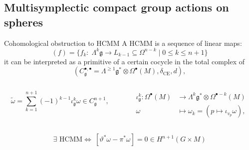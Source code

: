 \documentclass[handout,10pt]{beamer}
\begin{document}
\subsection{Multisymplectic compact group actions on spheres}

\begin{frame}[fragile]{Cohomological obstruction to HCMM}
A HCMM is a sequence of linear maps:
			\begin{displaymath}
				(f)  = \big\lbrace f_k: \; \Lambda^k{\mathfrak g} \to L_{k-1} \subseteq \Omega^{n-k} 
				\;\big\vert\; 0\leq k \leq n+1  \big\rbrace
			\end{displaymath}
it can be interpreted as a primitive of a certain cocycle in the total complex of 
	\begin{displaymath}
		(C_\mathfrak{g}^{\bullet,\bullet} = \Lambda^{\geq 1} 
		\mathfrak{g}^*\otimes \Omega^\bullet(M), \delta_\text{CE},d),	
	\end{displaymath}
	\pause
	\begin{propblock}[$\exists$ HCMM 
		$\Leftrightarrow ~ \lbrack\tilde{\omega}\rbrack=0\in H^{n+1}(C_\mathfrak g^\bullet,d_ {tot})$	
	]
		\begin{columns}
		\begin{column}{.5\textwidth}
			\begin{displaymath}
				\tilde{\omega} = \sum_{k=1}^{n+1} (-1)^{k-1} \iota^k_\mathfrak{g} \omega \in C_\mathfrak{g}^{n+1},
			\end{displaymath}		
		\end{column}
		\begin{column}{.5\textwidth}
			\begin{align*}
				\iota^k_\mathfrak{g} \colon \Omega^\bullet(M)
				&\to \Lambda^k \mathfrak{g}^\ast \otimes \Omega^{\bullet-k}(M)
				\\ \omega&\mapsto \omega_k = 
				\left(p \mapsto \iota_{v_p} \omega  \right) ,
			\end{align*}
		\end{column}		
		\end{columns} 
	\end{propblock}
	\pause
	\begin{corblock}
	$$\exists \text{ HCMM} 
		\Leftrightarrow ~[\vartheta^*\omega-\pi^*\omega]=0\in H^{n+1}(G\times M)$$ 
	\end{corblock}

\end{frame}
\end{document}
